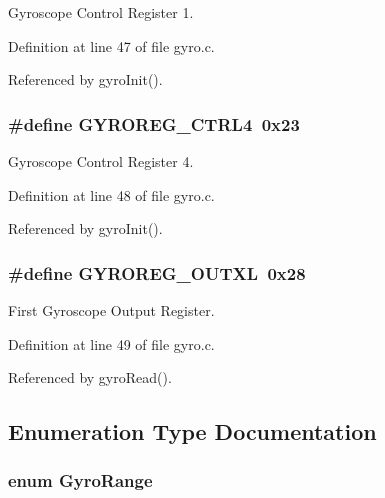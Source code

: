Gyroscope Control Register 1. 



Definition at line 47 of file gyro.\-c.



Referenced by gyro\-Init().

\hypertarget{group__gyro_gae9b6f4aab3818fdb4c99970918e0a705}{
\subsubsection[{G\-Y\-R\-O\-R\-E\-G\-\_\-\-C\-T\-R\-L4}]{\setlength{\rightskip}{0pt plus 5cm}\#define G\-Y\-R\-O\-R\-E\-G\-\_\-\-C\-T\-R\-L4~0x23}}\label{group__gyro_gae9b6f4aab3818fdb4c99970918e0a705}


Gyroscope Control Register 4. 



Definition at line 48 of file gyro.\-c.



Referenced by gyro\-Init().

\hypertarget{group__gyro_ga8840a0f1e53e6999ddf435a61c0dc279}{
\subsubsection[{G\-Y\-R\-O\-R\-E\-G\-\_\-\-O\-U\-T\-X\-L}]{\setlength{\rightskip}{0pt plus 5cm}\#define G\-Y\-R\-O\-R\-E\-G\-\_\-\-O\-U\-T\-X\-L~0x28}}\label{group__gyro_ga8840a0f1e53e6999ddf435a61c0dc279}


First Gyroscope Output Register. 



Definition at line 49 of file gyro.\-c.



Referenced by gyro\-Read().



\subsection{Enumeration Type Documentation}
\hypertarget{group__gyro_ga12b0e0572fdceaa90874f9364c862ead}{
\subsubsection[{Gyro\-Range}]{\setlength{\rightskip}{0pt plus 5cm}enum {\bf Gyro\-Range}}}\label{group__gyro_ga12b0e0572fdceaa90874f9364c862ead}


